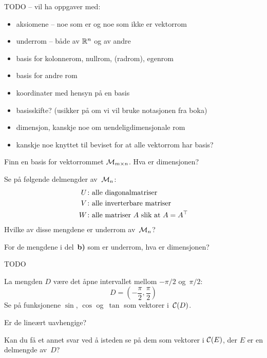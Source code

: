 

\linje
TODO --
vil ha oppgaver med:
\begin{itemize}
\item aksiomene -- noe som er og noe som ikke er vektorrom
\item underrom -- både av $\mathbb{R}^n$ og av andre
\item basis for kolonnerom, nullrom, (radrom), egenrom
\item basis for andre rom
\item koordinater med hensyn på en basis
\item basisskifte?  (usikker på om vi vil bruke notasjonen fra boka)
\item dimensjon, kanskje noe om uendeligdimensjonale rom
\item kanskje noe knyttet til beviset for at alle vektorrom har basis?
\end{itemize}
\linje


\begin{oppgave}
\begin{punkt}
Finn en basis for vektorrommet $\mathcal{M}_{m \times n}$.  Hva er dimensjonen?
\end{punkt}
\begin{punkt}
Se på følgende delmengder av~$\mathcal{M}_n$:
\begin{align*}
U \colon &\text{alle diagonalmatriser} \\
V \colon &\text{alle inverterbare matriser} \\
W \colon &\text{alle matriser~$A$ slik at $A = A^\top$}
\end{align*}
Hvilke av disse mengdene er underrom av~$\mathcal{M}_n$?
\end{punkt}
\begin{punkt}
For de mengdene i del~\textbf{b)} som er underrom, hva er dimensjonen?
\end{punkt}
\end{oppgave}

\begin{losning}
TODO
\end{losning}


\begin{oppgave}
La mengden $D$ være det åpne intervallet mellom $-\pi/2$ og~$\pi/2$:
\[
D = \left( - \frac{\pi}{2}, \frac{\pi}{2} \right)
\]
Se på funksjonene $\sin$, $\cos$ og~$\tan$ som vektorer i~$\mathcal{C}(D)$.
\begin{punkt}
Er de lineært uavhengige?
\end{punkt}
\begin{punkt}
Kan du få et annet svar ved å isteden se på dem som vektorer i
$\mathcal{C}(E)$, der $E$ er en delmengde av~$D$?
\end{punkt}
\end{oppgave}


